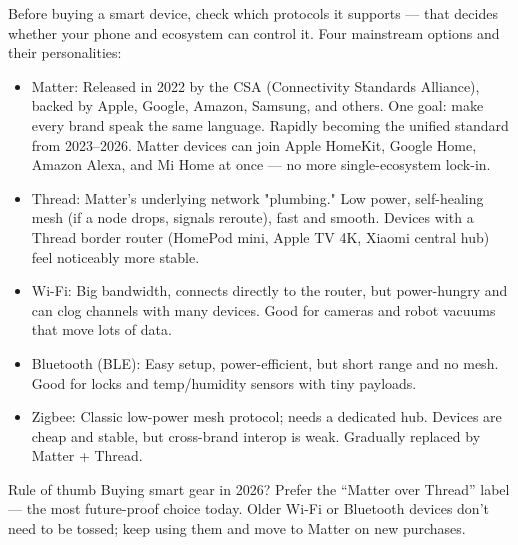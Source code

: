 


Before buying a smart device, check which protocols it supports — that decides whether your phone and ecosystem can control it. Four mainstream options and their personalities:

\begin{itemize}
  \item Matter: Released in 2022 by the CSA (Connectivity Standards Alliance), backed by Apple, Google, Amazon, Samsung, and others. One goal: make every brand speak the same language. Rapidly becoming the unified standard from 2023–2026. Matter devices can join Apple HomeKit, Google Home, Amazon Alexa, and Mi Home at once — no more single-ecosystem lock-in.
  \item Thread: Matter's underlying network "plumbing." Low power, self-healing mesh (if a node drops, signals reroute), fast and smooth. Devices with a Thread border router (HomePod mini, Apple TV 4K, Xiaomi central hub) feel noticeably more stable.
  \item Wi-Fi: Big bandwidth, connects directly to the router, but power-hungry and can clog channels with many devices. Good for cameras and robot vacuums that move lots of data.
  \item Bluetooth (BLE): Easy setup, power-efficient, but short range and no mesh. Good for locks and temp/humidity sensors with tiny payloads.
  \item Zigbee: Classic low-power mesh protocol; needs a dedicated hub. Devices are cheap and stable, but cross-brand interop is weak. Gradually replaced by Matter + Thread.
\end{itemize}

\begin{tcbinfo}{Rule of thumb}
Buying smart gear in 2026? Prefer the “Matter over Thread” label — the most future-proof choice today. Older Wi-Fi or Bluetooth devices don't need to be tossed; keep using them and move to Matter on new purchases.

\end{tcbinfo}

